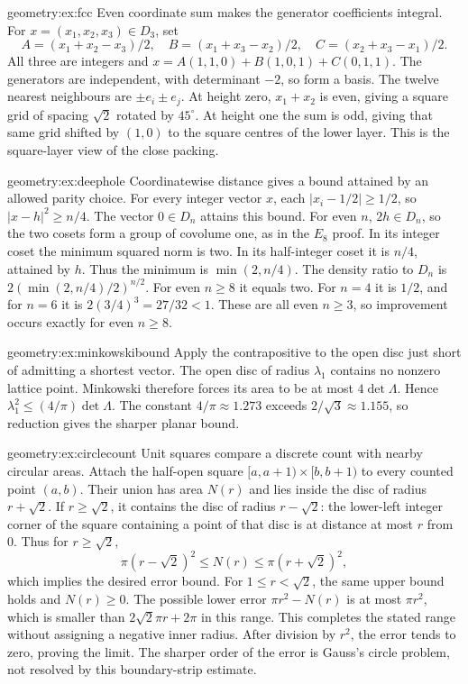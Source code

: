 \begin{solution}{geometry:ex:fcc}
\idea Even coordinate sum makes the generator coefficients integral.
\writeup For $x=(x_1,x_2,x_3)\in D_3$, set
\[
 A=(x_1+x_2-x_3)/2,\quad B=(x_1+x_3-x_2)/2,\quad
 C=(x_2+x_3-x_1)/2.
\]
All three are integers and
$x=A(1,1,0)+B(1,0,1)+C(0,1,1)$.
The generators are independent, with determinant $-2$, so form a basis.
The twelve nearest neighbours are $\pm e_i\pm e_j$.
At height zero, $x_1+x_2$ is even, giving a square grid of spacing
$\sqrt2$ rotated by $45^\circ$. At height one the sum is odd, giving
that same grid shifted by $(1,0)$ to the square centres of the lower
layer. This is the square-layer view of the close packing.
\end{solution}
\begin{solution}{geometry:ex:deephole}
\idea Coordinatewise distance gives a bound attained by an allowed parity
choice.
\writeup For every integer vector $x$, each $|x_i-1/2|\ge1/2$,
so $|x-h|^2\ge n/4$. The vector $0\in D_n$ attains this bound.
For even $n$, $2h\in D_n$, so the two cosets form a group of covolume
one, as in the $E_8$ proof. In its integer coset the minimum squared
norm is two. In its half-integer coset it is $n/4$, attained by $h$.
Thus the minimum is $\min(2,n/4)$.
The density ratio to $D_n$ is
$2(\min(2,n/4)/2)^{n/2}$.
For even $n\ge8$ it equals two. For $n=4$ it is $1/2$, and for
$n=6$ it is $2(3/4)^3=27/32<1$.
These are all even $n\ge3$, so improvement occurs exactly for even
$n\ge8$.
\end{solution}
\begin{solution}{geometry:ex:minkowskibound}
\idea Apply the contrapositive to the open disc just short of admitting a
shortest vector.
\writeup The open disc of radius $\lambda_1$ contains no nonzero
lattice point. Minkowski therefore forces its area to be at most
$4\det\Lambda$. Hence
$\lambda_1^2\le(4/\pi)\det\Lambda$.
The constant $4/\pi\approx1.273$ exceeds $2/\sqrt3\approx1.155$,
so reduction gives the sharper planar bound.
\end{solution}
\begin{solution}{geometry:ex:circlecount}
\idea Unit squares compare a discrete count with nearby circular areas.
\writeup Attach the half-open square $[a,a+1)\times[b,b+1)$ to every
counted point $(a,b)$. Their union has area $N(r)$ and lies inside the
disc of radius $r+\sqrt2$. If $r\ge\sqrt2$, it contains the disc of
radius $r-\sqrt2$: the lower-left integer corner of the square containing
a point of that disc is at distance at most $r$ from $0$.
Thus for $r\ge\sqrt2$,
\[
 \pi(r-\sqrt2)^2\le N(r)\le\pi(r+\sqrt2)^2,
\]
which implies the desired error bound.
For $1\le r<\sqrt2$, the same upper bound holds and $N(r)\ge0$.
The possible lower error $\pi r^2-N(r)$ is at most $\pi r^2$,
which is smaller than $2\sqrt2\pi r+2\pi$ in this range.
This completes the stated range without assigning a negative inner radius.
After division by $r^2$, the error tends to zero, proving the limit.
The sharper order of the error is Gauss's circle problem, not resolved by
this boundary-strip estimate.
\end{solution}
